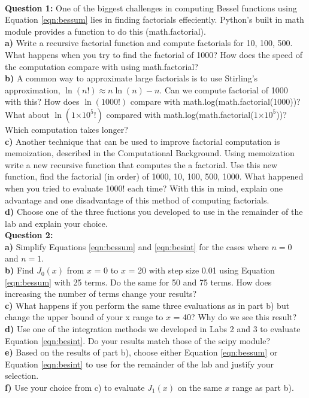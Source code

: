 \documentclass[a4paper,12pt]{article}
\providecommand{\e}[1]{\ensuremath{\times 10^{#1}}}
\begin{document}
\\
\textbf{Question 1:} One of the biggest challenges in computing Bessel functions using Equation \ref{eqn:bessum} lies in finding factorials effeciently. Python's built in math module provides a function to do this (math.factorial).\\
\textbf{a)} Write a recursive factorial function and compute factorials for 10, 100, 500. What happens when you try to find the factorial of 1000? How does the speed of the computation compare with using math.factorial?\\
\textbf{b)} A common way to approximate large factorials is to use Stirling's approximation, $\ln(n!) \approx n\ln(n) - n$. Can we compute factorial of 1000 with this? How does $\ln(1000!)$ compare with math.log(math.factorial(1000))? What about $\ln(1\e{5}!)$ compared with math.log(math.factorial($1\e{5}$))? Which computation takes longer?\\
\textbf{c)} Another technique that can be used to improve factorial computation is memoization, described in the Computational Background. Using memoization write a new recursive function that computes the a factorial. Use this new function, find the factorial (in order) of 1000, 10, 100, 500, 1000. What happened when you tried to evaluate 1000! each time?  With this in mind, explain one advantage and one disadvantage of this method of computing factorials. \\
\textbf{d)} Choose one of the three fuctions you developed to use in the remainder of the lab and explain your choice.\\

\textbf{Question 2:} \\
\textbf{a)} Simplify Equations \ref{eqn:bessum} and \ref{eqn:besint} for the cases where $n = 0$ and $n = 1$.\\
\textbf{b)} Find $J_0(x)$ from $x$ = 0 to $x$ = 20 with step size 0.01 using Equation \ref{eqn:bessum} with 25 terms. Do the same for 50 and 75 terms. How does increasing the number of terms change your results? \\
\textbf{c)} What happens if you perform the same three evaluations as in part b) but change the upper bound of your x range to $x$ = 40? Why do we see this result? \\
\textbf{d)} Use one of the integration methods we developed in Labs 2 and 3 to evaluate Equation \ref{eqn:besint}. Do your results match those of the scipy module?\\
\textbf{e)} Based on the results of part b), choose either Equation \ref{eqn:bessum} or Equation \ref{eqn:besint} to use for the remainder of the lab and justify your selection.\\
\textbf{f)} Use your choice from c) to evaluate $J_1(x)$ on the same $x$ range as part b). \\
\end{document}
